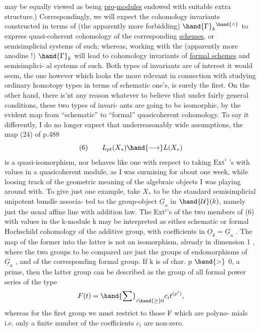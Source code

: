 
may be equally viewed as being \uline{pro}-\uline{modules} endowed with suitable extra
structure.) Correspondingly, we will expect the cohomology invariants
constructed in terms of (the apparently more forbidding) $\hand{\Gamma}_k{}^{\hand{\wedge}}$ to express
quasi-coherent cohomology of the corresponding \uline{schemes}, or semisimplicial
systems of such; whereas, working with the (apparently more anodine !)
$\hand{\Gamma}_k$ will lead to cohomology invariants of \uline{formal schemes} and semisimplici-%
al systems of such. Both types of invariants are of interest it would
seem, the one however which looks the more relevant in connection with
studying ordinary homotopy types in terms of schematic one's, is surely
the first. On the other hand, there is'nt any reason whatever to
believe that under fairly general conditions, these two types of invari-%
ants are going to be isomorphic, by the evident map from ``schematic'' to
``formal'' quasicoherent cohomology. To say it differently, I do no longer
expect that underreasonably wide assumptions, the map (24) of p.488
\[
(6)\qquad L_{pt}(X_{*})\hand{\longrightarrow} L(X_{*})
\]
is a quasi-isomorphism, nor behaves like one with respect to taking
$\mathrm{Ext}^{i}$ 's with values in a quasicoherent module, as I was  surmising for
about one week, while loosing track of the geometric meaning of the
algebraic objects I was playing around with. To give just one example,
take $X_{*}$ to be the standard semisimplicial  unipotent bundle associa-%
ted to the group-object $\underline{G}_a$ in $\hand{\mathcal{U}}(k)$, namely just the usual affine line
with addition law. The Ext$^{i}$'s of the two members of (6) with values in
the k-module k may be interpreted as either schematic or formal Hochschild
cohomology of the additive group, with coefficients in  $\underline{O}_k = \underline{G}_a$ .
The map of the former into the latter is not  an isomorphism, already
in dimension 1 , where the two groups to be compared are just the groups
of endomorphisms of $\underline{G}_a$ , and of the corresponding formal group. If k is
of char. p $\hand{>}$ 0, a prime, then the latter group can be described as the
group of all formal power series of the type
\[
F(t) = \hand{\sum}_{i\hand{\geq} 0} c_i t^{(p^{i})} ,
\]
whereas for the first group we must restrict to those F which are polyno-%
mials i.e.  only a finite number of the coefficients $c_i$ are non-zero.

